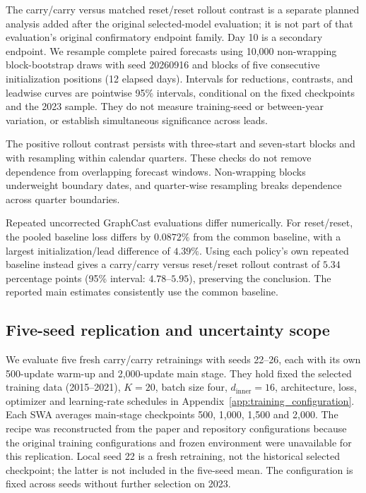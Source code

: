 \documentclass{article}
\newcommand{\vfourchange}[1]{{\color{blue}#1}}
\begin{document}
\vfourchange{The carry/carry versus matched reset/reset rollout contrast is a separate planned analysis added after the original selected-model evaluation; it is not part of that evaluation's original confirmatory endpoint family. Day 10 is a secondary endpoint. We resample complete paired forecasts using 10,000 non-wrapping block-bootstrap draws with seed 20260916 and blocks of five consecutive initialization positions (12 elapsed days). Intervals for reductions, contrasts, and leadwise curves are pointwise 95\% intervals, conditional on the fixed checkpoints and the 2023 sample. They do not measure training-seed or between-year variation, or establish simultaneous significance across leads.}

\vfourchange{The positive rollout contrast persists with three-start and seven-start blocks and with resampling within calendar quarters. These checks do not remove dependence from overlapping forecast windows. Non-wrapping blocks underweight boundary dates, and quarter-wise resampling breaks dependence across quarter boundaries.}

\vfourchange{Repeated uncorrected GraphCast evaluations differ numerically. For reset/reset, the pooled baseline loss differs by $0.0872\%$ from the common baseline, with a largest initialization/lead difference of $4.39\%$. Using each policy's own repeated baseline instead gives a carry/carry versus reset/reset rollout contrast of $5.34$ percentage points (95\% interval: $4.78$--$5.95$), preserving the conclusion. The reported main estimates consistently use the common baseline.}



\subsection{\vfourchange{Five-seed replication and uncertainty scope}}
\label{app:seed_replication}

\vfourchange{We evaluate five fresh carry/carry retrainings with seeds 22--26, each with its own 500-update warm-up and 2,000-update main stage. They hold fixed the selected training data (2015--2021), $K=20$, batch size four, $d_{\mathrm{inner}}=16$, architecture, loss, optimizer and learning-rate schedules in Appendix~\ref{app:training_configuration}. Each SWA averages main-stage checkpoints 500, 1,000, 1,500 and 2,000. The recipe was reconstructed from the paper and repository configurations because the original training configurations and frozen environment were unavailable for this replication. Local seed 22 is a fresh retraining, not the historical selected checkpoint; the latter is not included in the five-seed mean. The configuration is fixed across seeds without further selection on 2023.}
\end{document}

